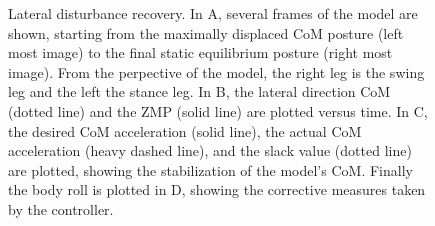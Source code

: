 \documentclass{llncs}
\begin{document}
\begin{figure}[b]
\centering
 \vspace{-10pt}
\caption{Lateral disturbance recovery.  
In A, several frames of the model are shown, starting from the maximally displaced CoM posture (left most image) to the final static equilibrium posture 
(right most image). 
From the perpective of the model, the right leg is the swing leg and the left the stance leg. 
In B, the lateral direction CoM (dotted line) and the ZMP (solid line) are plotted versus time. 
In C, the desired CoM acceleration (solid line), the actual CoM acceleration (heavy dashed line), and the slack value (dotted line) are plotted, 
showing the stabilization of the model’s CoM. 
Finally the body roll is plotted in D, showing the corrective measures taken by the controller.}
\label{fig:LateralDisturbanceSequence}
\end{figure}
\end{document}
